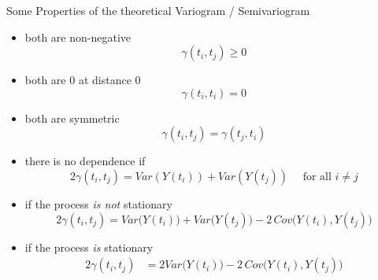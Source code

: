 \documentclass[11pt,ignorenonframetext,]{beamer}
\providecommand{\tightlist}{%
  \setlength{\itemsep}{0pt}\setlength{\parskip}{0pt}}
\begin{document}
\begin{frame}[t]{Some Properties of the theoretical Variogram /
Semivariogram}

\vspace{-3mm}

\begin{itemize}
\tightlist
\item
  both are non-negative \footnotesize \[\gamma(t_i, t_j) \geq 0\]
  \normalsize
\end{itemize}

\vspace{2mm}

\begin{itemize}
\tightlist
\item
  both are 0 at distance 0 \footnotesize \[\gamma(t_i, t_i) = 0\]
  \normalsize
\end{itemize}

\vspace{2mm}

\begin{itemize}
\tightlist
\item
  both are symmetric
  \footnotesize \[\gamma(t_i, t_j) = \gamma(t_j, t_i)\] \normalsize
\end{itemize}

\vspace{2mm}

\begin{itemize}
\tightlist
\item
  there is no dependence if
  \footnotesize \[2\gamma(t_i, t_j) = Var(Y(t_i)) + Var(Y(t_j)) \quad \text{ for all } i \ne j\]
  \normalsize
\end{itemize}

\vspace{2mm}

\begin{itemize}
\tightlist
\item
  if the process \emph{is not} stationary \footnotesize
  \[2\gamma(t_i, t_j) = Var\big(Y(t_i)\big) + Var\big(Y(t_j)\big) - 2 \, Cov\big(Y(t_i),Y(t_j)\big)\]
\end{itemize}

\vspace{2mm}

\begin{itemize}
\tightlist
\item
  if the process \emph{is} stationary \footnotesize
  \[\begin{aligned}
  2\gamma(t_i, t_j) 
    &= 2Var\big(Y(t_i)\big) - 2 \, Cov\big(Y(t_i),Y(t_j)\big)
  \end{aligned}\]
\end{itemize}

\end{frame}
\end{document}

